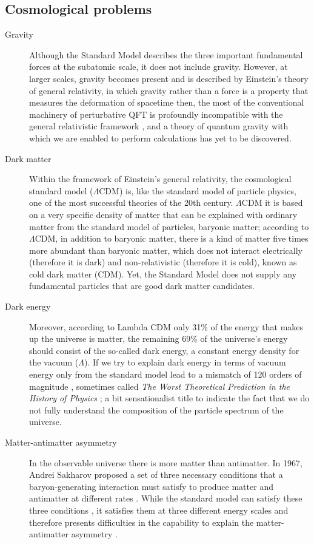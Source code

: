 \subsection{Cosmological problems}
\begin{description}
	\item[Gravity] Although the Standard Model describes the three important fundamental forces at the subatomic scale, it does not include gravity. However, at larger scales, gravity becomes present and is described by Einstein's theory of general relativity, in which gravity rather than a force is a property that measures the deformation of spacetime then, the most of the conventional machinery of perturbative QFT is profoundly incompatible with the general relativistic framework \cite{book:217893}, and a theory of quantum gravity with which we are enabled to perform calculations has yet to be discovered.
	
	
	
	
	\item[Dark matter] Within the framework of Einstein's general relativity, the cosmological standard model ($\Lambda$CDM) is, like the standard model of particle physics, one of the most successful theories of the 20th century. $\Lambda$CDM it is based on a very specific density of matter that can be explained with ordinary matter from the standard model of particles, baryonic matter; according to $\Lambda$CDM, in addition to baryonic matter, there is a kind of matter five times more abundant than baryonic matter, which does not interact electrically (therefore it is dark) and non-relativistic (therefore it is cold), known as cold dark matter (CDM).  Yet, the Standard Model does not supply any fundamental particles that are good dark matter candidates.
	\item[Dark energy] Moreover, according to Lambda CDM only 31\% of the energy that makes up the universe is matter, the remaining 69\% of the universe's energy should consist of the so-called dark energy, a constant energy density for the vacuum ($\Lambda$). If we try to explain dark energy in terms of vacuum energy only from the standard model lead to a mismatch of 120 orders of magnitude \cite{Adler1995}, sometimes called \textit{The Worst Theoretical Prediction in the History of Physics} \cite{book:15261}; a bit sensationalist title to indicate the fact that we do not fully understand the composition of the particle spectrum of the universe.
	
	\item[Matter-antimatter asymmetry] In the observable universe there is more matter than antimatter. In 1967, Andrei Sakharov proposed a set of three necessary conditions that a baryon-generating interaction must satisfy to produce matter and antimatter at different rates \cite{1967JETPL...5...24S}. While the standard model can satisfy these three conditions \cite{PhysRevLett.37.8,ph/0609145},  it satisfies them at three different energy scales and therefore presents difficulties in the capability to explain the  matter-antimatter asymmetry \cite{robinson2011symmetry}. 
	
\end{description}
